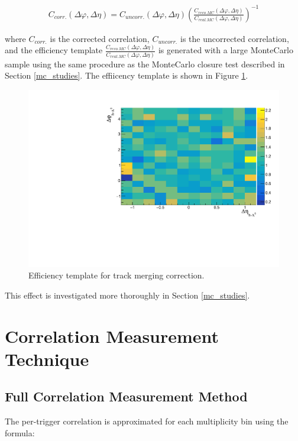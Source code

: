 \documentclass[ALICE,manyauthors]{ALICE_analysis_notes}
\begin{document}
\begin{itemize}
\begin{align*}
	C_{corr.}(\Delta\varphi, \Delta\eta) = C_{uncorr.}(\Delta\varphi, \Delta\eta)(\frac{C_{reco. MC}(\Delta\varphi, \Delta\eta)}{C_{real. MC}(\Delta\varphi, \Delta\eta)})^{-1}
\end{align*}

where $C_{corr.}$ is the corrected correlation, $C_{uncorr.}$ is the uncorrected correlation, and the efficiency template $\frac{C_{reco. MC}(\Delta\varphi, \Delta\eta)}{C_{real. MC}(\Delta\varphi, \Delta\eta)}$ is generated with a large MonteCarlo sample using the same procedure as the MonteCarlo closure test described in Section \ref{mc_studies}. The effiicency template is shown in Figure \ref{trackmerge_efficiency_plot}.


\begin{figure}[ht]
\centering
\includegraphics[width=5in]{figures/trackmerge_efficiency_PLACEHOLDER.pdf}
\caption{Efficiency template for track merging correction.}
\label{trackmerge_efficiency_plot}
\end{figure}

This effect is investigated more thoroughly in Section \ref{mc_studies}.

\section{Correlation Measurement Technique}
\label{corrsec}
\subsection{Full Correlation Measurement Method}

The per-trigger correlation is approximated for each multiplicity bin using the formula:


\end{itemize}
\end{document}
